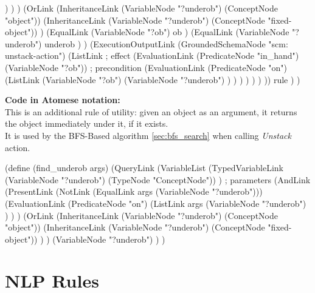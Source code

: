 \begin{python}
                )
              )
            )
            (OrLink
              (InheritanceLink
                (VariableNode "?underob")
                (ConceptNode "object"))
              (InheritanceLink
                (VariableNode "?underob")
                (ConceptNode "fixed-object"))
            )
            (EqualLink
              (VariableNode "?ob")
              ob
            )
            (EqualLink
              (VariableNode "?underob")
              underob
            )
          )
          (ExecutionOutputLink
            (GroundedSchemaNode "scm: unstack-action")
            (ListLink
              ; effect
              (EvaluationLink
                (PredicateNode "in_hand")
                (VariableNode "?ob"))
              ; precondition
              (EvaluationLink
                (PredicateNode "on")
                (ListLink
                  (VariableNode "?ob")
                  (VariableNode "?underob")
                )
              )
            )
          )
        )
      )
    ))
    rule
  )
)
\end{python}
 
\bigskip

\begin{footnotesize}
\textbf{Code in Atomese notation:} \\
This is an additional rule of utility: given an object as an argument, it returns the object immediately under it, if it exists. \\
It is used by the BFS-Based algorithm \ref{sec:bfs_search} when calling \textit{Unstack} action.
\end{footnotesize}

\begin{python}
(define (find_underob args)
  (QueryLink
    (VariableList
      (TypedVariableLink 
        (VariableNode "?underob") 
        (TypeNode "ConceptNode"))
    ) ; parameters
    (AndLink
      (PresentLink
        (NotLink
          (EqualLink args 
          (VariableNode "?underob")))
        (EvaluationLink
          (PredicateNode "on")
            (ListLink
              args
              (VariableNode "?underob")
            )
        )
      )
      (OrLink
        (InheritanceLink
          (VariableNode "?underob")
          (ConceptNode "object"))
        (InheritanceLink
          (VariableNode "?underob")
          (ConceptNode "fixed-object"))
      )
    )
    (VariableNode "?underob")
  )
)
\end{python}


\section{NLP Rules}\label{sec:NLP} 

